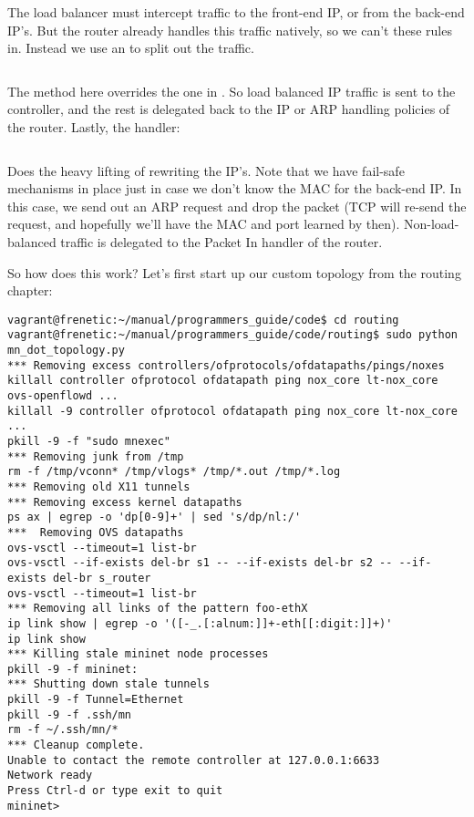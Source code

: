 The load balancer must intercept traffic to the front-end IP, or from the back-end IP's.  But the
router already handles this traffic natively, so we can't  these rules in.   Instead
we use an  to split out the traffic.  

\inputminted[firstline=19,lastline=30]{python}{code/routing_variants/load_balancer_handler.py} 

The  method here overrides the one in .  So load balanced
IP traffic is sent to the controller,  and the rest is delegated back to the IP or ARP handling
policies of the router.  Lastly, the  handler:

\inputminted[firstline=32]{python}{code/routing_variants/load_balancer_handler.py} 

Does the heavy lifting of rewriting the IP's.  Note that we have fail-safe mechanisms in place
just in case we don't know the MAC for the back-end IP.  In this case, we send out an ARP request
and drop the packet (TCP will re-send the request, and hopefully we'll have the MAC and port
learned by then).  Non-load-balanced traffic is delegated to the Packet In handler of the
router.  

So how does this work?  Let's first start up our custom topology from the routing chapter:

\begin{verbatim}
vagrant@frenetic:~/manual/programmers_guide/code$ cd routing
vagrant@frenetic:~/manual/programmers_guide/code/routing$ sudo python mn_dot_topology.py
*** Removing excess controllers/ofprotocols/ofdatapaths/pings/noxes
killall controller ofprotocol ofdatapath ping nox_core lt-nox_core ovs-openflowd ...
killall -9 controller ofprotocol ofdatapath ping nox_core lt-nox_core ...
pkill -9 -f "sudo mnexec"
*** Removing junk from /tmp
rm -f /tmp/vconn* /tmp/vlogs* /tmp/*.out /tmp/*.log
*** Removing old X11 tunnels
*** Removing excess kernel datapaths
ps ax | egrep -o 'dp[0-9]+' | sed 's/dp/nl:/'
***  Removing OVS datapaths
ovs-vsctl --timeout=1 list-br
ovs-vsctl --if-exists del-br s1 -- --if-exists del-br s2 -- --if-exists del-br s_router
ovs-vsctl --timeout=1 list-br
*** Removing all links of the pattern foo-ethX
ip link show | egrep -o '([-_.[:alnum:]]+-eth[[:digit:]]+)'
ip link show
*** Killing stale mininet node processes
pkill -9 -f mininet:
*** Shutting down stale tunnels
pkill -9 -f Tunnel=Ethernet
pkill -9 -f .ssh/mn
rm -f ~/.ssh/mn/*
*** Cleanup complete.
Unable to contact the remote controller at 127.0.0.1:6633
Network ready
Press Ctrl-d or type exit to quit
mininet>
\end{verbatim}

